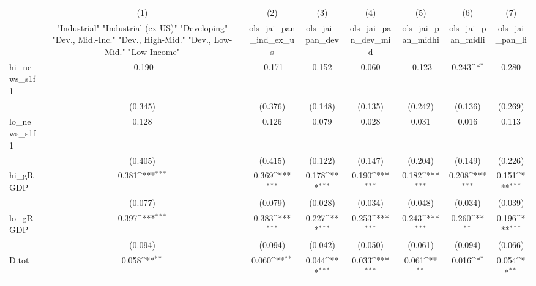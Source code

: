 {
\def\sym#1{\ifmmode^{#1}\else\(^{#1}\)\fi}
\begin{tabular}{l*{7}{c}}
\toprule
            &\multicolumn{1}{c}{(1)}&\multicolumn{1}{c}{(2)}&\multicolumn{1}{c}{(3)}&\multicolumn{1}{c}{(4)}&\multicolumn{1}{c}{(5)}&\multicolumn{1}{c}{(6)}&\multicolumn{1}{c}{(7)}\\
            &\multicolumn{1}{c}{ "Industrial" "Industrial (ex-US)" "Developing" "Dev., Mid.-Inc." "Dev., High-Mid."  "Dev., Low-Mid." "Low Income" }&\multicolumn{1}{c}{ols\_jai\_pan\_ind\_ex\_us}&\multicolumn{1}{c}{ols\_jai\_pan\_dev}&\multicolumn{1}{c}{ols\_jai\_pan\_dev\_mid}&\multicolumn{1}{c}{ols\_jai\_pan\_midhi}&\multicolumn{1}{c}{ols\_jai\_pan\_midli}&\multicolumn{1}{c}{ols\_jai\_pan\_li}\\
\midrule
hi\_news\_s1f1&      -0.190         &      -0.171         &       0.152         &       0.060         &      -0.123         &       0.243\sym{*}  &       0.280         \\
            &     (0.345)         &     (0.376)         &     (0.148)         &     (0.135)         &     (0.242)         &     (0.136)         &     (0.269)         \\
\addlinespace
lo\_news\_s1f1&       0.128         &       0.126         &       0.079         &       0.028         &       0.031         &       0.016         &       0.113         \\
            &     (0.405)         &     (0.415)         &     (0.122)         &     (0.147)         &     (0.204)         &     (0.149)         &     (0.226)         \\
\addlinespace
hi\_gRGDP    &       0.381\sym{***}&       0.369\sym{***}&       0.178\sym{***}&       0.190\sym{***}&       0.182\sym{***}&       0.208\sym{***}&       0.151\sym{***}\\
            &     (0.077)         &     (0.079)         &     (0.028)         &     (0.034)         &     (0.048)         &     (0.034)         &     (0.039)         \\
\addlinespace
lo\_gRGDP    &       0.397\sym{***}&       0.383\sym{***}&       0.227\sym{***}&       0.253\sym{***}&       0.243\sym{***}&       0.260\sym{**} &       0.196\sym{***}\\
            &     (0.094)         &     (0.094)         &     (0.042)         &     (0.050)         &     (0.061)         &     (0.094)         &     (0.066)         \\
\addlinespace
D.tot       &       0.058\sym{**} &       0.060\sym{**} &       0.044\sym{***}&       0.033\sym{***}&       0.061\sym{**} &       0.016\sym{*}  &       0.054\sym{**} \\

\end{tabular}}
